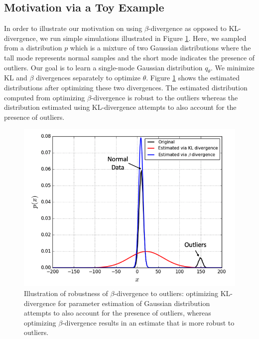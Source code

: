 \documentclass{article}
\theoremstyle{plain}
\theoremstyle{definition}
\begin{document}
\subsection{Motivation via a Toy Example}
In order to illustrate our motivation on using $\beta$-divergence as opposed to KL-divergence, we run simple simulations illustrated in Figure \ref{fig:simulations_compare_KL_with_beta}. Here, we sampled from a distribution $p$ which is a mixture of two Gaussian distributions where the tall mode represents normal samples and the short mode indicates the presence of outliers. Our goal is to learn a single-mode Gaussian distribution $q_{\theta}$. We minimize KL and $\beta$ divergences separately to optimize $\theta$. Figure \ref{fig:simulations_compare_KL_with_beta} shows the estimated distributions after optimizing these two divergences. The estimated distribution computed from optimizing $\beta$-divergence is robust to the outliers whereas the distribution estimated using KL-divergence attempts to also account for the presence of outliers.

\begin{figure}[h!]
	\centering
	\includegraphics[scale=0.3]{./figures/simulations_compare_KL_with_beta.png}
	\caption{Illustration of robustness of $\beta$-divergence to outliers: optimizing KL-divergence for parameter estimation of Gaussian distribution attempts to also account for the presence of outliers, whereas optimizing $\beta$-divergence results in an estimate that is more robust to outliers.}	
	\label{fig:simulations_compare_KL_with_beta}
\end{figure}
\end{document}
